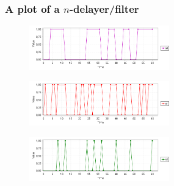 \begin{frame}
  \frametitle{A plot of a $n$-delayer/filter}



  \begin{figure}
    \includegraphics[width=0.54\textwidth]{../my_models/1serieDelFil_Corrector/plot_S0.png}
  \end{figure}

  \begin{figure}
    \includegraphics[width=0.54\textwidth]{../my_models/1serieDelFil_Corrector/plot_S1.png}
  \end{figure}

  \begin{figure}
    \includegraphics[width=0.54\textwidth]{../my_models/1serieDelFil_Corrector/plot_S2.png}
  \end{figure}

\end{frame}

